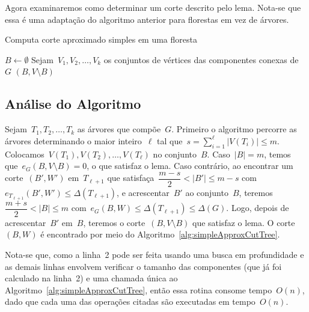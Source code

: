 \documentclass[a4paper,12pt]{article}
\begin{document}
\bigskip

Agora examinaremos como determinar um corte descrito pelo lema.
Nota-se que essa é uma adaptação do algoritmo anterior
para florestas em vez de árvores.

\medskip
\medskip

\begin{algorithm}[H]
\label{alg:simpleApproxCutForest}

	\caption{Computa corte aproximado simples em uma floresta}
	$B \gets \emptyset$\;
	Sejam~$V_1, V_2,\ldots, V_k$ os conjuntos de vértices das
	componentes conexas de~$G$\;
	\Return $(B,V\setminus B)$\;

\end{algorithm}	

\bigskip
\bigskip
\bigskip

\subsection*{Análise do Algoritmo}

	Sejam~${T_1, T_2, \ldots,T_k}$ as árvores que compõe~$G$. 
	Primeiro o algoritmo percorre as árvores determinando
	o maior inteiro~$\ell$ tal 
	que~${s=\displaystyle\sum_{i=1}^{\ell}|V(T_i)| \le m}$.
	Colocamos~${V(T_1),V(T_2), \ldots,V(T_\ell)}$ no conjunto~$B$.
	Caso~${|B|=m}$, temos que~${e_G(B,V\setminus B)=0}$, o que 
	satisfaz o lema.
	Caso contrário, ao encontrar um corte~$(B',W')$ em~$T_{\ell+1}$
	que satisfaça~${\dfrac{m-s}{2}<|B'|\le m-s}$ 
	com~${e_{T_{\ell+1}}(B',W') \le \Delta(T_{\ell+1})}$, e 
	acrescentar~$B'$ ao conjunto~$B$, 
	teremos~${\dfrac{m+s}{2}<|B| \le m}$ 
	com~${e_G(B,W)\le\Delta(T_{\ell+1}) \le \Delta(G)}$.
	Logo, depois de acrescentar~$B'$ em~$B$, teremos o 
	corte~${(B,V\setminus B)}$ que satisfaz o lema.
	O corte~$(B,W)$ é encontrado por meio do 
	Algoritmo~\ref{alg:simpleApproxCutTree}.

	
	Nota-se que, como a linha~2 pode ser feita usando uma busca em 
	profundidade e as demais linhas envolvem verificar o tamanho 
	das componentes (que já foi calculado na linha~2) e uma 
	chamada única ao Algoritmo~\ref{alg:simpleApproxCutTree}, então 
	essa rotina consome tempo~$O(n)$, dado que cada uma 
	das operações citadas são executadas em tempo~$O(n)$. 
\end{document}

